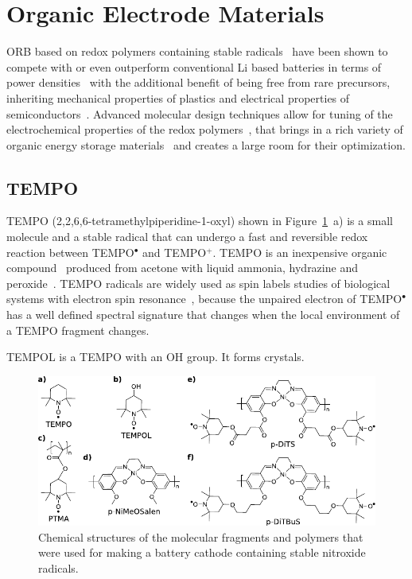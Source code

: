 \section{Organic Electrode Materials}
ORB based on redox polymers containing stable radicals~\cite{nakahara2002_cpl} have been shown to compete with or even outperform  conventional Li based batteries in terms of power densities~\cite{IWASA2007} with the additional benefit of being free from rare precursors, inheriting mechanical properties of plastics and electrical properties of semiconductors~\cite{friebe2017_topcurrchem,Casado2021,Goujon2021}. Advanced molecular design techniques allow for tuning of the electrochemical properties of the redox polymers~\cite{Janoschka2017}, that brings in a rich variety of organic energy storage materials~\cite{Xie2021,Vereshchagin2022,Janoschka2017a} and creates a large room for their optimization. 

\par
\subsection{TEMPO}
TEMPO (2,2,6,6-tetramethylpiperidine-1-oxyl) shown in Figure~\ref{fig:molecules}~a) is a small molecule and a stable radical that can undergo a fast and reversible redox reaction between TEMPO$^\bullet$ and TEMPO$^+$. TEMPO is an inexpensive organic compound~\cite{Vereshchagin2022} produced from acetone with liquid ammonia, hydrazine and peroxide~\cite{Casado_2021_book}. TEMPO radicals are widely used as spin labels studies of biological systems with electron spin resonance~\cite{Bordignon2017}, because the unpaired electron of TEMPO$^\bullet$ has a well defined spectral signature that changes when the local environment of a TEMPO fragment changes.

TEMPOL is a TEMPO with an OH group. It forms crystals.

\begin{figure}[h]
\center
	\includegraphics[width=1\textwidth]{./electrochemistry/figures/materials/molecules.pdf}
	\caption{Chemical structures of the molecular fragments and polymers that were used for making a battery cathode containing stable nitroxide radicals.}
	\label{fig:molecules}
\end{figure}



